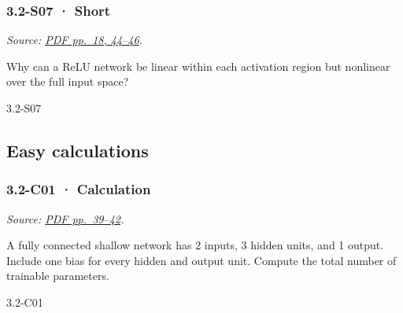 \noindent\begin{minipage}{\linewidth}

\subsubsection{3.2-S07 · Short}\label{s07-short-8}

\emph{Source:
\href{../Lecture\%20Slides/3.2.\%20Shallow\%20NN.pdf\#page=18}{PDF
pp.~18, 44--46}.}

Why can a ReLU network be linear within each activation region but
nonlinear over the full input space?

\begin{solution}[20mm]{3.2-S07}

\end{solution}
\end{minipage}\par\medskip

\subsection{Easy calculations}\label{easy-calculations-8}

\noindent\begin{minipage}{\linewidth}

\subsubsection{3.2-C01 · Calculation}\label{c01-calculation-8}

\emph{Source:
\href{../Lecture\%20Slides/3.2.\%20Shallow\%20NN.pdf\#page=39}{PDF
pp.~39--42}.}

A fully connected shallow network has 2 inputs, 3 hidden units, and 1
output. Include one bias for every hidden and output unit. Compute the
total number of trainable parameters.

\begin{solution}[26mm]{3.2-C01}

\end{solution}
\end{minipage}\par\medskip

